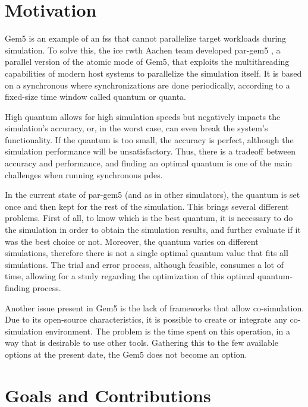 \section{Motivation}

Gem5 is an example of an \gls{fss} that cannot parallelize target workloads during simulation. To solve this, the \gls{ice} \gls{rwth} Aachen team 
developed par-gem5 \cite{pargem5}, a parallel version of the atomic mode of Gem5, that exploits the multithreading capabilities of modern host 
systems to parallelize the simulation itself. 
It is based on a synchronous  where synchronizations are done periodically, according to a fixed-size time window called quantum 
or quanta.

High quantum allows for high simulation speeds but negatively impacts the simulation's accuracy, or, in the worst case, can even break the system's 
functionality. If the quantum is too small, the accuracy is perfect, although the simulation performance will be unsatisfactory. Thus, there is a 
tradeoff between accuracy and performance, and finding an optimal quantum is one of the main challenges when running synchronous \gls{pdes}.

In the current state of par-gem5 (and as in other simulators), the quantum is set once and then kept for the rest of the simulation. This brings 
several different problems. First of all, to know which is the best quantum, it is necessary to do the simulation in order to obtain the simulation 
results, and further evaluate if it was the best choice or not. Moreover, the quantum varies on different simulations, therefore there is not a 
single optimal quantum value that fits all simulations. The trial and error process, although feasible, consumes a lot of time, allowing for a 
study regarding the optimization of this optimal quantum-finding process. 

Another issue present in Gem5 is the lack of frameworks that allow co-simulation. Due to its open-source characteristics, it is possible to 
create or integrate any co-simulation environment. The problem is the time spent on this operation, in a way that is desirable to use other 
tools. Gathering this to the few available options at the present date, the Gem5 does not become an option.

\section{Goals and Contributions}

